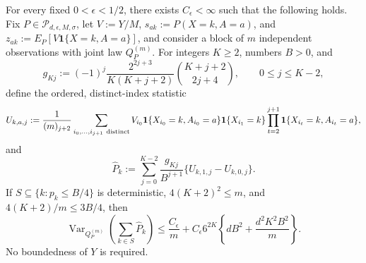 For every fixed \(0<\epsilon<1/2\), there exists \(C_{\epsilon}<\infty\) such that the following holds.  Fix \(P\in\mathcal P_{d,\epsilon,M,\sigma}\), let \(V:=Y/M\), \(s_{ak}:=P(X=k,A=a)\), and \(z_{ak}:=E_P[V\mathbf 1\{X=k,A=a\}]\), and consider a block of \(m\) independent observations with joint law \(Q_P^{(m)}\).  For integers \(K\ge2\), numbers \(B>0\), and
\[
 g_{Kj}:=(-1)^j\frac{2^{2j+3}}{K(K+j+2)}\binom{K+j+2}{2j+4},\qquad 0\le j\le K-2,
\]
define the ordered, distinct-index statistic
\[
 U_{k,a,j}:=\frac{1}{(m)_{j+2}}
 \sum_{i_0,\ldots,i_{j+1}\ {\rm distinct}}
 V_{i_0}\mathbf 1\{X_{i_0}=k,A_{i_0}=a\}
 \mathbf 1\{X_{i_1}=k\}
 \prod_{t=2}^{j+1}\mathbf 1\{X_{i_t}=k,A_{i_t}=a\},
\]
and
\[
 \widehat P_k:=\sum_{j=0}^{K-2}\frac{g_{Kj}}{B^{j+1}}
 \{U_{k,1,j}-U_{k,0,j}\}.
\]
If \(S\subseteq\{k:p_k\le B/4\}\) is deterministic, \(4(K+2)^2\le m\), and \(4(K+2)/m\le3B/4\), then
\[
 \operatorname{Var}_{Q_P^{(m)}}\!\left(\sum_{k\in S}\widehat P_k\right)
 \le \frac{C_{\epsilon}}m+C_{\epsilon}6^{2K}
 \left\{dB^2+\frac{d^2K^2B^2}{m}\right\}.
\]
No boundedness of \(Y\) is required.